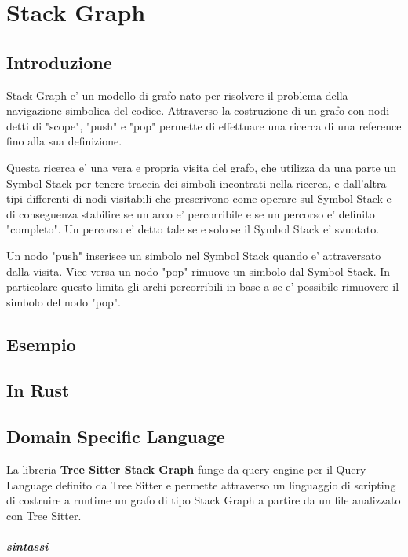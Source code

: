 \chapter{Stack Graph}

\section{Introduzione}
Stack Graph e' un modello di grafo nato per risolvere il problema della navigazione simbolica del codice.
Attraverso la costruzione di un grafo con nodi detti di "scope", "push" e "pop" permette di effettuare una ricerca di una reference fino alla sua definizione.

Questa ricerca e' una vera e propria visita del grafo, che utilizza da una parte un Symbol Stack per tenere traccia dei simboli incontrati nella ricerca, e dall'altra tipi differenti di nodi visitabili che prescrivono come operare sul Symbol Stack e di conseguenza stabilire se un arco e' percorribile e se un percorso e' definito "completo".
Un percorso e' detto tale se e solo se il Symbol Stack e' svuotato.

Un nodo "push" inserisce un simbolo nel Symbol Stack quando e' attraversato dalla visita.
Vice versa un nodo "pop" rimuove un simbolo dal Symbol Stack.
In particolare questo limita gli archi percorribili in base a se e' possibile rimuovere il simbolo del nodo "pop".

\section{Esempio}

\section{In Rust}

\section{Domain Specific Language}

La libreria \textbf{Tree Sitter Stack Graph} funge da query engine per il Query Language definito da Tree Sitter e permette attraverso un linguaggio di scripting di costruire a runtime un grafo di tipo Stack Graph a partire da un file analizzato con Tree Sitter.

\paragraph{sintassi}

